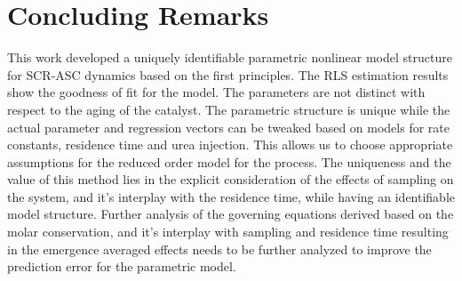 \section{Concluding Remarks}
This work developed a uniquely identifiable parametric nonlinear model structure for SCR-ASC dynamics based on the first
principles. The RLS estimation results show the goodness of fit for the model. The parameters are not distinct with
respect to the aging of the catalyst. The parametric structure is unique while the actual parameter and regression
vectors can be tweaked based on models for rate constants, residence time and urea injection. This allows us to choose
appropriate assumptions for the reduced order model for the process. The uniqueness and the value of this method lies in
the explicit consideration of the effects of sampling on the system, and it's interplay with the residence time, while
having an identifiable model structure. Further analysis of the governing equations derived based on the molar
conservation, and it's interplay with sampling and residence time resulting in the emergence averaged effects needs to
be further analyzed to improve the prediction error for the parametric model.
